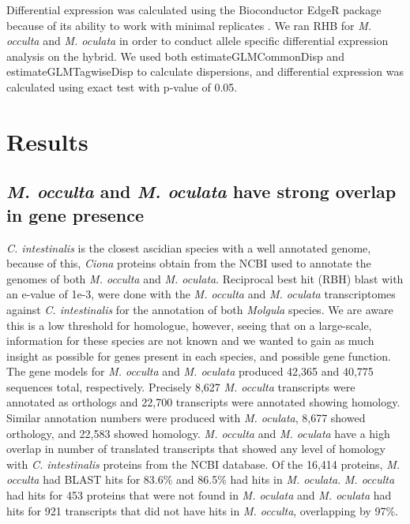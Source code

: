 Differential expression was calculated using the Bioconductor EdgeR package because of its ability to work with minimal replicates \cite{robinson_edger:_2010}. We ran RHB  for \textit{M. occulta} and \textit{M. oculata} in order to conduct allele specific differential expression analysis on the hybrid. We used both estimateGLMCommonDisp and estimateGLMTagwiseDisp to calculate dispersions, and differential expression was calculated using exact test with p-value of 0.05. 

\section{Results}
\subsection{\textit{M. occulta} and \textit{M. oculata} have strong overlap in gene presence}
\textit{C. intestinalis} is the closest ascidian species with a well annotated genome, because of this, \textit{Ciona} proteins obtain from the NCBI used to annotate the genomes of both \textit{M. occulta} and \textit{M. oculata}. Reciprocal best hit (RBH) blast with an e-value of 1e-3, were done with the \textit{M. occulta} and \textit{M. oculata} transcriptomes against \textit{C. intestinalis} for the annotation of both \textit{Molgula} species.  We are aware this is a low threshold for homologue, however, seeing that on a large-scale, information for these species are not known and we wanted to gain as much insight as possible for genes present in each species, and possible gene function. The gene models for \textit{M. occulta} and \textit{M. oculata} produced 42,365 and 40,775 sequences total, respectively. Precisely 8,627 \textit{M. occulta} transcripts were annotated as orthologs and 22,700 transcripts were annotated showing homology. Similar annotation numbers were produced with \textit{M. oculata}, 8,677 showed orthology, and 22,583 showed homology. \textit{M. occulta} and \textit{M. oculata} have a high overlap in number of translated transcripts that showed any level of homology with \textit{C. intestinalis} proteins from the NCBI database. Of the 16,414  proteins, \textit{M. occulta} had BLAST hits for 83.6\% and 86.5\% had hits in \textit{M. oculata}. \textit{M. occulta} had hits for 453 proteins that were not found in \textit{M. oculata} and \textit{M. oculata} had hits for 921 transcripts that did not have hits in \textit{M. occulta}, overlapping by 97\%.

